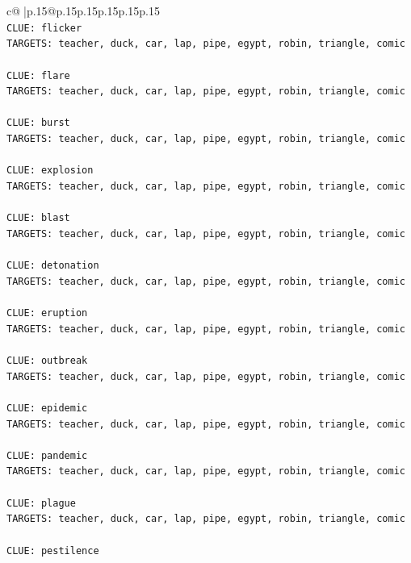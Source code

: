 \documentclass{article}
\begin{document}
{\begin{supertabular}{c@{$\;$}|p{.15\linewidth}@{}p{.15\linewidth}p{.15\linewidth}p{.15\linewidth}p{.15\linewidth}p{.15\linewidth}}
{{{\\ 
\texttt{CLUE: flicker} \\
\texttt{TARGETS: teacher, duck, car, lap, pipe, egypt, robin, triangle, comic} \\
\\ 
\texttt{CLUE: flare} \\
\texttt{TARGETS: teacher, duck, car, lap, pipe, egypt, robin, triangle, comic} \\
\\ 
\texttt{CLUE: burst} \\
\texttt{TARGETS: teacher, duck, car, lap, pipe, egypt, robin, triangle, comic} \\
\\ 
\texttt{CLUE: explosion} \\
\texttt{TARGETS: teacher, duck, car, lap, pipe, egypt, robin, triangle, comic} \\
\\ 
\texttt{CLUE: blast} \\
\texttt{TARGETS: teacher, duck, car, lap, pipe, egypt, robin, triangle, comic} \\
\\ 
\texttt{CLUE: detonation} \\
\texttt{TARGETS: teacher, duck, car, lap, pipe, egypt, robin, triangle, comic} \\
\\ 
\texttt{CLUE: eruption} \\
\texttt{TARGETS: teacher, duck, car, lap, pipe, egypt, robin, triangle, comic} \\
\\ 
\texttt{CLUE: outbreak} \\
\texttt{TARGETS: teacher, duck, car, lap, pipe, egypt, robin, triangle, comic} \\
\\ 
\texttt{CLUE: epidemic} \\
\texttt{TARGETS: teacher, duck, car, lap, pipe, egypt, robin, triangle, comic} \\
\\ 
\texttt{CLUE: pandemic} \\
\texttt{TARGETS: teacher, duck, car, lap, pipe, egypt, robin, triangle, comic} \\
\\ 
\texttt{CLUE: plague} \\
\texttt{TARGETS: teacher, duck, car, lap, pipe, egypt, robin, triangle, comic} \\
\\ 
\texttt{CLUE: pestilence} \\
}}}
\end{supertabular}}
\end{document}
